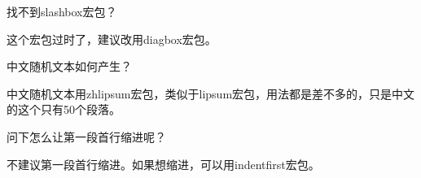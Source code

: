 \documentclass[QA.tex]{subfiles}
\begin{document}
\begin{qst}\label{Q2018020805}
 找不到slashbox宏包？
\end{qst}
\ans 这个宏包过时了，建议改用diagbox宏包。

\begin{qst}\label{Q2018020806}
 中文随机文本如何产生？
\end{qst}
\ans 中文随机文本用zhlipsum宏包，类似于lipsum宏包，用法都是差不多的，只是中文的这个只有50个段落。

\begin{qst}\label{Q2018020807}
 问下怎么让第一段首行缩进呢？
\end{qst}
\ans 不建议第一段首行缩进。如果想缩进，可以用indentfirst宏包。

\end{document}
